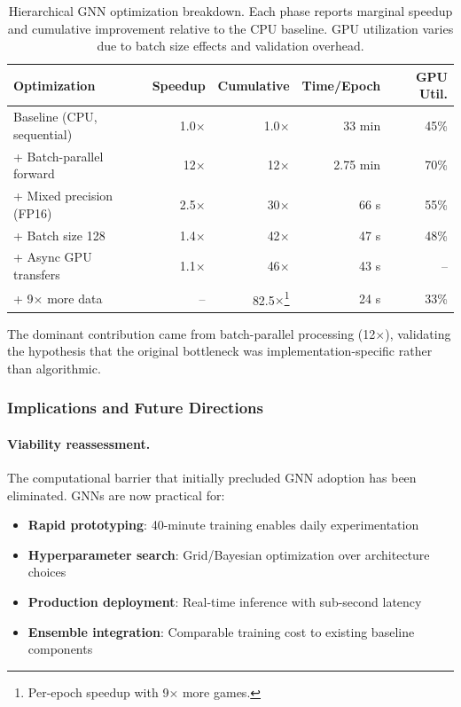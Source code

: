 \begin{table}[ht]
\centering
\begin{tabular}{lrrrr}
\toprule
\textbf{Optimization} & \textbf{Speedup} & \textbf{Cumulative} & \textbf{Time/Epoch} & \textbf{GPU Util.} \\
\midrule
Baseline (CPU, sequential) & 1.0$\times$ & 1.0$\times$ & 33 min & 45\% \\
+ Batch-parallel forward & 12$\times$ & 12$\times$ & 2.75 min & 70\% \\
+ Mixed precision (FP16) & 2.5$\times$ & 30$\times$ & 66 s & 55\% \\
+ Batch size 128 & 1.4$\times$ & 42$\times$ & 47 s & 48\% \\
+ Async GPU transfers & 1.1$\times$ & 46$\times$ & 43 s & -- \\
+ 9$\times$ more data & -- & 82.5$\times$\footnote{Per-epoch speedup with 9$\times$ more games.} & 24 s & 33\% \\
\bottomrule
\end{tabular}
\caption{Hierarchical GNN optimization breakdown. Each phase reports marginal speedup and cumulative improvement relative to the CPU baseline. GPU utilization varies due to batch size effects and validation overhead.}
\label{tab:gnn_optimization_breakdown}
\end{table}

The dominant contribution came from batch-parallel processing (12$\times$), validating the hypothesis that the original bottleneck was implementation-specific rather than algorithmic.

\subsubsection{Implications and Future Directions}

\paragraph{Viability reassessment.} The computational barrier that initially precluded GNN adoption has been eliminated. GNNs are now practical for:
\begin{itemize}
    \item \textbf{Rapid prototyping}: 40-minute training enables daily experimentation
    \item \textbf{Hyperparameter search}: Grid/Bayesian optimization over architecture choices
    \item \textbf{Production deployment}: Real-time inference with sub-second latency
    \item \textbf{Ensemble integration}: Comparable training cost to existing baseline components
\end{itemize}

